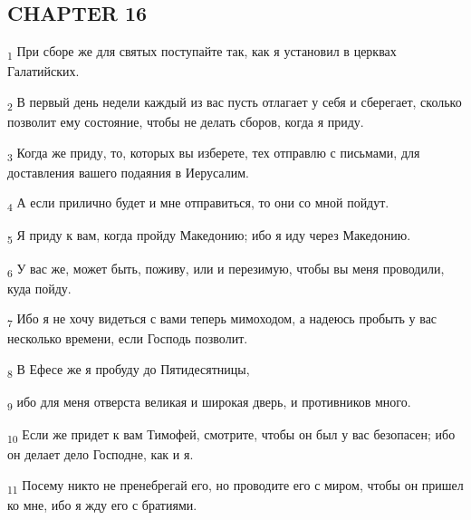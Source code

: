 \subsection{CHAPTER 16}
\begin{tcolorbox}
\textsubscript{1} При сборе же для святых поступайте так, как я установил в церквах Галатийских.
\end{tcolorbox}
\begin{tcolorbox}
\textsubscript{2} В первый день недели каждый из вас пусть отлагает у себя и сберегает, сколько позволит ему состояние, чтобы не делать сборов, когда я приду.
\end{tcolorbox}
\begin{tcolorbox}
\textsubscript{3} Когда же приду, то, которых вы изберете, тех отправлю с письмами, для доставления вашего подаяния в Иерусалим.
\end{tcolorbox}
\begin{tcolorbox}
\textsubscript{4} А если прилично будет и мне отправиться, то они со мной пойдут.
\end{tcolorbox}
\begin{tcolorbox}
\textsubscript{5} Я приду к вам, когда пройду Македонию; ибо я иду через Македонию.
\end{tcolorbox}
\begin{tcolorbox}
\textsubscript{6} У вас же, может быть, поживу, или и перезимую, чтобы вы меня проводили, куда пойду.
\end{tcolorbox}
\begin{tcolorbox}
\textsubscript{7} Ибо я не хочу видеться с вами теперь мимоходом, а надеюсь пробыть у вас несколько времени, если Господь позволит.
\end{tcolorbox}
\begin{tcolorbox}
\textsubscript{8} В Ефесе же я пробуду до Пятидесятницы,
\end{tcolorbox}
\begin{tcolorbox}
\textsubscript{9} ибо для меня отверста великая и широкая дверь, и противников много.
\end{tcolorbox}
\begin{tcolorbox}
\textsubscript{10} Если же придет к вам Тимофей, смотрите, чтобы он был у вас безопасен; ибо он делает дело Господне, как и я.
\end{tcolorbox}
\begin{tcolorbox}
\textsubscript{11} Посему никто не пренебрегай его, но проводите его с миром, чтобы он пришел ко мне, ибо я жду его с братиями.
\end{tcolorbox}

